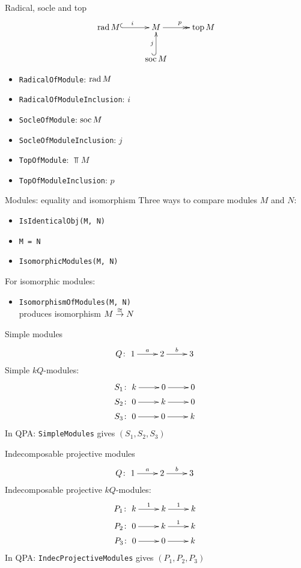 \begin{frame}{Radical, socle and top}
\[
\xymatrix{
\rad M \ar@{^{(}->}[r]^i &
M \ar@{->>}[r]^p &
\Top M \\
& \soc M \ar@{^{(}->}[u]^j
}
\]
\begin{itemize}
\item \texttt{RadicalOfModule}: $\operatorname{rad} M$
\item \texttt{RadicalOfModuleInclusion}: $i$
\item \texttt{SocleOfModule}: $\operatorname{soc} M$
\item \texttt{SocleOfModuleInclusion}: $j$
\item \texttt{TopOfModule}: $\Top M$
\item \texttt{TopOfModuleInclusion}: $p$
\end{itemize}
\end{frame}


\begin{frame}{Modules: equality and isomorphism}
Three ways to compare modules $M$ and $N$:
\begin{itemize}
\item \texttt{IsIdenticalObj(M, N)}
\item \texttt{M = N}
\item \texttt{IsomorphicModules(M, N)}
\end{itemize}
For isomorphic modules:
\begin{itemize}
\item \texttt{IsomorphismOfModules(M, N)}\\
produces isomorphism $M \stackrel{\cong}{\to} N$
\end{itemize}
\end{frame}


\begin{frame}{Simple modules}
\[
Q\colon
\xymatrix{1 \ar[r]^a & 2 \ar[r]^b & 3}
\]
Simple $kQ$-modules:
\begin{gather*}
S_1\colon \xymatrix{k \ar[r] & 0 \ar[r] & 0} \\
S_2\colon \xymatrix{0 \ar[r] & k \ar[r] & 0} \\
S_3\colon \xymatrix{0 \ar[r] & 0 \ar[r] & k}
\end{gather*}
\pause
In QPA: \texttt{SimpleModules} gives $(S_1, S_2, S_3)$
\end{frame}

\begin{frame}{Indecomposable projective modules}
\[
Q\colon
\xymatrix{1 \ar[r]^a & 2 \ar[r]^b & 3}
\]
Indecomposable projective $kQ$-modules:
\begin{gather*}
P_1\colon \xymatrix{k \ar[r]^1 & k \ar[r]^1 & k} \\
P_2\colon \xymatrix{0 \ar[r]   & k \ar[r]^1 & k} \\
P_3\colon \xymatrix{0 \ar[r]   & 0 \ar[r]   & k}
\end{gather*}
\pause
In QPA: \texttt{IndecProjectiveModules} gives $(P_1, P_2, P_3)$
\end{frame}

